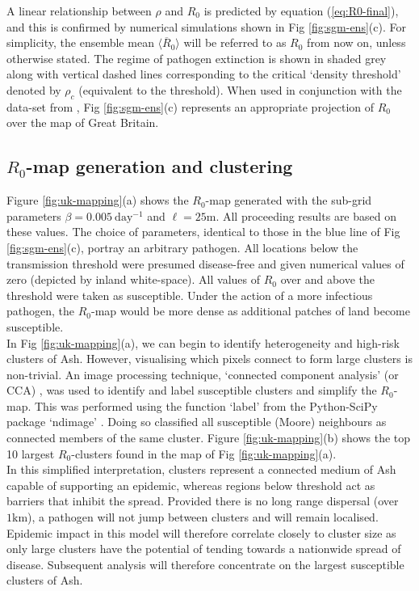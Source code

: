 A linear relationship between $\rho$ and $R_0$ is predicted by equation (\ref{eq:R0-final}), and this is confirmed by numerical simulations shown in Fig \ref{fig:sgm-ens}(c). For simplicity, the ensemble mean $\langle \overline{R}_0 \rangle$ will be referred to as $R_0$ from now on, unless otherwise stated. The regime of pathogen extinction is shown in shaded grey along with vertical dashed lines corresponding to the critical `density threshold' denoted by $\rho_c$  (equivalent to the threshold). When used in conjunction with the data-set from \cite{hill.data}, Fig \ref{fig:sgm-ens}(c) represents an appropriate projection of $R_0$ over the map of Great Britain.\\

\subsection{$R_0$-map generation and clustering}
\label{section:sgm-clustering}

Figure \ref{fig:uk-mapping}(a) shows the  $R_0$-map generated with the sub-grid parameters $\beta=0.005\ \mathrm{day^{-1}}$ and $\ell=25 \mathrm{m}$. All proceeding results are based on these values. The choice of parameters, identical to those in the blue line of Fig \ref{fig:sgm-ens}(c), portray an arbitrary pathogen. All locations below the transmission threshold were presumed disease-free and given numerical values of zero (depicted by inland white-space). All values of $R_0$ over and above the threshold were taken as susceptible. Under the action of a more infectious pathogen, the $R_0$-map would be more dense as additional patches of land become susceptible.\\

In Fig \ref{fig:uk-mapping}(a), we can begin to identify heterogeneity and high-risk clusters of Ash. However, visualising which pixels connect to form large clusters is non-trivial. An image processing technique, `connected component analysis' (or CCA) \cite{CCA1, CCA2}, was used to identify and label susceptible clusters and simplify the $R_0$-map. This was performed using the function `label' from the Python-SciPy package `ndimage' \cite{scipy}. Doing so classified all susceptible (Moore) neighbours as connected members of the same cluster. Figure \ref{fig:uk-mapping}(b) shows the top 10 largest $R_0$-clusters found in the map of Fig \ref{fig:uk-mapping}(a).\\

In this simplified interpretation, clusters represent a connected medium of Ash capable of supporting an epidemic, whereas regions below threshold act as barriers that inhibit the spread. Provided there is no long range dispersal (over $\mathrm{1km}$), a pathogen will not jump between clusters and will remain localised. Epidemic impact in this model will therefore correlate closely to cluster size as only large clusters have the potential of tending towards a nationwide spread of disease. Subsequent analysis will therefore concentrate on the largest susceptible clusters of Ash.\\

